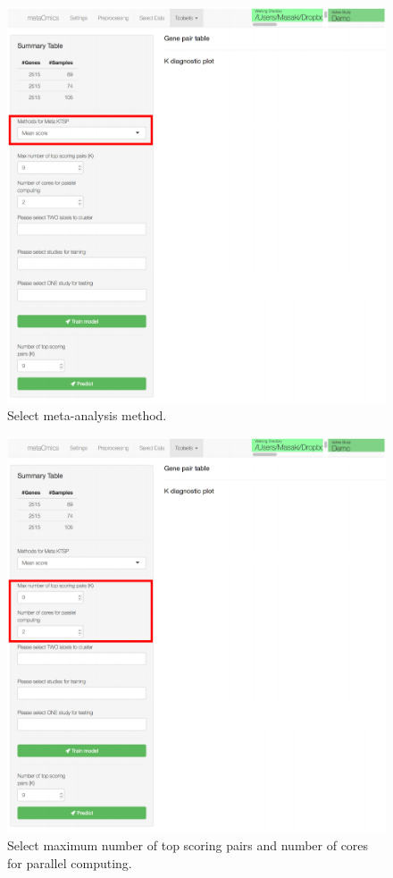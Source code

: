 \documentclass{article}
\begin{document}
\begin{figure}[H]
\begin{center}
\includegraphics[scale=0.7]{./figure/MetaKTSP/Figure5.pdf}
\caption{Select meta-analysis method.}
\label{fig:MethodSelect}
\end{center}
\end{figure}

\begin{figure}[H]
\begin{center}
\includegraphics[scale=0.7]{./figure/MetaKTSP/Figure6.pdf}
\caption{Select maximum number of top scoring pairs and number of cores for parallel computing.}
\label{fig:NumK}
\end{center}
\end{figure}
\end{document}
